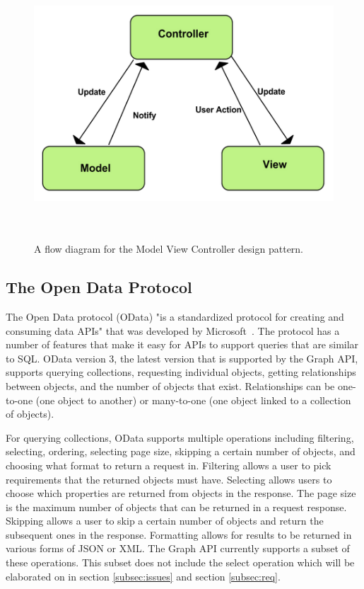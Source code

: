 \documentclass[se]{uw-wkrpt}
\begin{document}
\begin{figure}
  \centering
  \includegraphics[height=3in]{mvc}
  \caption[A flow diagram for the Model View Controller design pattern.]{A flow diagram for the Model View Controller design pattern.}~\cite{ref:mvc}
  \label{fig:mvc}
\end{figure}

\subsection{The Open Data Protocol}

The Open Data protocol (OData) "is a standardized protocol for creating and consuming data APIs" that was developed by Microsoft~\cite{ref:odata}. The protocol has a number of features that make it easy for APIs to support queries that are similar to SQL. OData version 3, the latest version that is supported by the Graph API, supports querying collections, requesting individual objects, getting relationships between objects, and the number of objects that exist. Relationships can be one-to-one (one object to another) or many-to-one (one object linked to a collection of objects).

For querying collections, OData supports multiple operations including filtering, selecting, ordering, selecting page size, skipping a certain number of objects, and choosing what format to return a request in. Filtering allows a user to pick requirements that the returned objects must have. Selecting allows users to choose which properties are returned from objects in the response. The page size is the maximum number of objects that can be returned in a request response. Skipping allows a user to skip a certain number of objects and return the subsequent ones in the response. Formatting allows for results to be returned in various forms of JSON or XML. The Graph API currently supports a subset of these operations. This subset does not include the select operation which will be elaborated on in section \ref{subsec:issues} and section \ref{subsec:req}.
\end{document}
